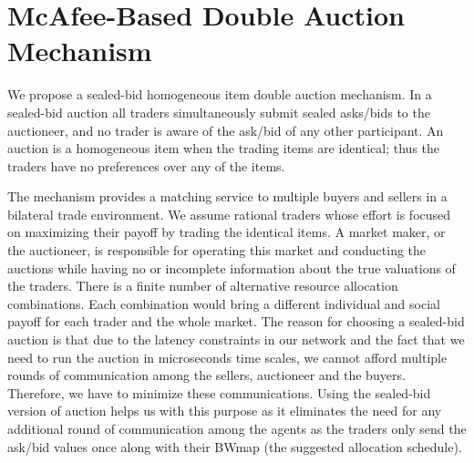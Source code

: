 \section{McAfee-Based Double Auction Mechanism}
\label{sec:auction_mechanism}
We propose a sealed-bid homogeneous item double auction mechanism. In a sealed-bid auction all traders simultaneously submit sealed asks/bids to the auctioneer, and no trader is aware of the ask/bid of any other participant. An auction is a homogeneous item when the trading items are identical; thus the traders have no preferences over any of the items.


The mechanism provides a matching service to multiple buyers and sellers in a bilateral trade environment. We assume rational traders whose effort is focused on maximizing their payoff by trading the identical items. A market maker, or the auctioneer, is responsible for operating this market and conducting the auctions while having no or incomplete information about the true valuations of the traders. There is a finite number of alternative resource allocation combinations. Each combination would bring a different individual and social payoff for each trader and the whole market.
The reason for choosing a sealed-bid auction is that due to the latency constraints in our network and the fact that we need to run the auction in microseconds time scales, we cannot afford multiple rounds of communication among the sellers, auctioneer and the buyers. Therefore, we have to minimize these communications. Using the sealed-bid version of auction helps us with this purpose as it eliminates the need for any additional round of communication among the agents as the traders only send the ask/bid values once along with their BWmap (the suggested allocation schedule).

